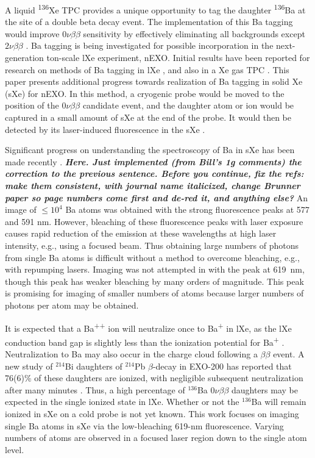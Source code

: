 \documentclass[aps,pra,reprint,superscriptaddress]{revtex4-1}
\begin{document}
A liquid \textsuperscript{136}Xe TPC provides a unique opportunity to tag the daughter \textsuperscript{136}Ba at the site of a double beta decay event. The implementation of this Ba tagging would improve $0\nu\beta\beta$ sensitivity by effectively eliminating all backgrounds except $2\nu\beta\beta$ \cite{Moe1991}.  Ba tagging is being investigated for possible incorporation in the next-generation ton-scale lXe experiment, nEXO.  Initial results have been reported for research on methods of Ba tagging in lXe \cite{Mong2015,Twelker2014}, and also in a Xe gas TPC \cite{Brunner2015}.  This paper presents additional progress towards realization of Ba tagging in solid Xe (sXe) for nEXO.  In this method, a cryogenic probe would be moved to the position of the $0\nu\beta\beta$ candidate event, and the daughter atom or ion would be captured in a small amount of sXe at the end of the probe.  It would then be detected by its laser-induced fluorescence in the sXe \cite{Mong2015}.

Significant progress on understanding the spectroscopy of Ba in sXe has been made recently \cite{Mong2015,McCaffrey2016}.  \textbf{\color{red}\emph{Here. Just implemented (from Bill's 1g comments) the correction to the previous sentence. Before you continue, fix the refs: make them consistent, with journal name italicized, change Brunner paper so page numbers come first and de-red it, and anything else?}} An image of $\leq 10^4$ Ba atoms was obtained with the strong fluorescence peaks at 577 and 591 nm.  However, bleaching of these fluorescence peaks with laser exposure causes rapid reduction of the emission at these wavelengths at high laser intensity, e.g., using a focused beam.  Thus obtaining large numbers of photons from single Ba atoms is difficult without a method to overcome bleaching, e.g., with repumping lasers.  Imaging was not attempted in \cite{Mong2015} with the peak at 619~nm, though this peak has weaker bleaching by many orders of magnitude.  This peak is promising for imaging of smaller numbers of atoms because larger numbers of photons per atom may be obtained.

It is expected that a Ba\textsuperscript{++} ion will neutralize once to Ba\textsuperscript{+} in lXe, as the lXe conduction band gap is slightly less than the ionization potential for Ba\textsuperscript{+} \cite{Moe1991}.  Neutralization to Ba may also occur in the charge cloud following a $\beta\beta$ event.  A new study of $^{214}$Bi daughters of $^{214}$Pb $\beta$-decay in EXO-200 has reported that 76(6)\% of these daughters are ionized, with negligible subsequent neutralization after many minutes \cite{alphaion}.  Thus, a high percentage of $^{136}$Ba $0\nu\beta\beta$ daughters may be expected in the single ionized state in lXe.  Whether or not the $^{136}$Ba will remain ionized in sXe on a cold probe is not yet known.  This work focuses on imaging single Ba atoms in sXe via the low-bleaching 619-nm fluorescence.  Varying numbers of atoms are observed in a focused laser region down to the single atom level.
\end{document}
